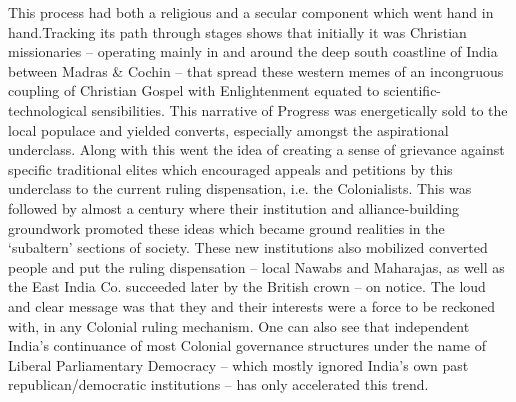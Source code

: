 This process had both a religious and a secular component which went hand in hand.Tracking its path through stages shows that initially it was Christian missionaries – operating mainly in and around the deep south coastline of India between Madras \& Cochin – that spread these western memes of an incongruous coupling of Christian Gospel with Enlightenment equated to scientific-technological sensibilities. This narrative of Progress was energetically sold to the local populace and yielded converts, especially amongst the aspirational underclass. Along with this went the idea of creating a sense of grievance against specific traditional elites which encouraged appeals and petitions by this underclass to the current ruling dispensation, i.e. the Colonialists. This was followed by almost a century where their institution and alliance-building groundwork promoted these ideas which became ground realities in the ‘subaltern’ sections of society. These new institutions also mobilized converted people and put the ruling dispensation – local Nawabs and Maharajas, as well as the East India Co. succeeded later by the British crown – on notice. The loud and clear message was that they and their interests were a force to be reckoned with, in any Colonial ruling mechanism. One can also see that independent India’s continuance of most Colonial governance structures under the name of Liberal Parliamentary Democracy – which mostly ignored India’s own past republican/democratic institutions – has only accelerated this trend.

